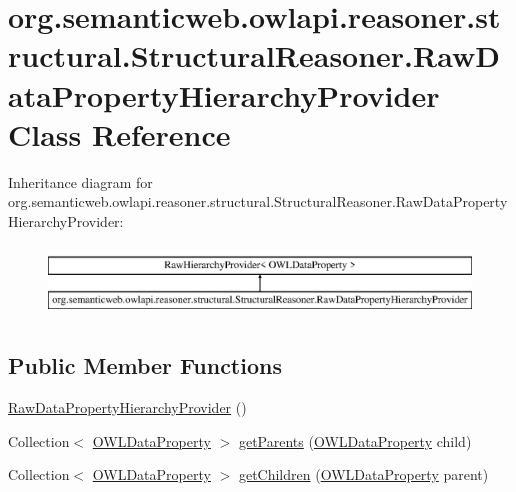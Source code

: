 \hypertarget{classorg_1_1semanticweb_1_1owlapi_1_1reasoner_1_1structural_1_1_structural_reasoner_1_1_raw_data_property_hierarchy_provider}{\section{org.\-semanticweb.\-owlapi.\-reasoner.\-structural.\-Structural\-Reasoner.\-Raw\-Data\-Property\-Hierarchy\-Provider Class Reference}
\label{classorg_1_1semanticweb_1_1owlapi_1_1reasoner_1_1structural_1_1_structural_reasoner_1_1_raw_data_property_hierarchy_provider}
}
Inheritance diagram for org.\-semanticweb.\-owlapi.\-reasoner.\-structural.\-Structural\-Reasoner.\-Raw\-Data\-Property\-Hierarchy\-Provider\-:\begin{figure}[H]
\begin{center}
\leavevmode
\includegraphics[height=1.901528cm]{classorg_1_1semanticweb_1_1owlapi_1_1reasoner_1_1structural_1_1_structural_reasoner_1_1_raw_data_property_hierarchy_provider}
\end{center}
\end{figure}
\subsection*{Public Member Functions}
\begin{DoxyCompactItemize}
\item 
\hyperlink{classorg_1_1semanticweb_1_1owlapi_1_1reasoner_1_1structural_1_1_structural_reasoner_1_1_raw_data_property_hierarchy_provider_a31382c2890abbe3b6258d8c09192a16e}{Raw\-Data\-Property\-Hierarchy\-Provider} ()
\item 
Collection$<$ \hyperlink{interfaceorg_1_1semanticweb_1_1owlapi_1_1model_1_1_o_w_l_data_property}{O\-W\-L\-Data\-Property} $>$ \hyperlink{classorg_1_1semanticweb_1_1owlapi_1_1reasoner_1_1structural_1_1_structural_reasoner_1_1_raw_data_property_hierarchy_provider_a27c1043ace3a994b3d9f5badbbd69b41}{get\-Parents} (\hyperlink{interfaceorg_1_1semanticweb_1_1owlapi_1_1model_1_1_o_w_l_data_property}{O\-W\-L\-Data\-Property} child)
\item 
Collection$<$ \hyperlink{interfaceorg_1_1semanticweb_1_1owlapi_1_1model_1_1_o_w_l_data_property}{O\-W\-L\-Data\-Property} $>$ \hyperlink{classorg_1_1semanticweb_1_1owlapi_1_1reasoner_1_1structural_1_1_structural_reasoner_1_1_raw_data_property_hierarchy_provider_a8378c2e0bc8abd8820319804cb395875}{get\-Children} (\hyperlink{interfaceorg_1_1semanticweb_1_1owlapi_1_1model_1_1_o_w_l_data_property}{O\-W\-L\-Data\-Property} parent)
\end{DoxyCompactItemize}


